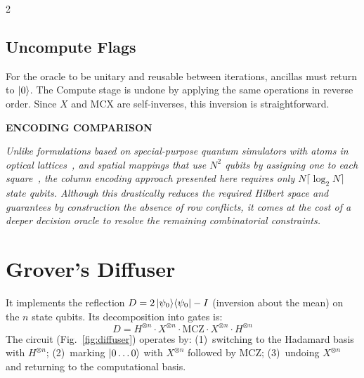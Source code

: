 \documentclass[9pt, a4paper]{extarticle}
\begin{document}
\begin{multicols}{2}
\subsection{Uncompute Flags}

For the oracle to be unitary and reusable between iterations, ancillas must return
to $\ket{0}$. The Compute stage is undone by applying the same operations in reverse
order. Since $X$ and MCX are self-inverses, this inversion is straightforward.

\vspace{0.3cm}
\noindent
\colorbox{boxbg}{%
\begin{minipage}{\dimexpr\columnwidth-2\fboxsep\relax}
\vspace{2pt}
{\small\sffamily\bfseries\color{accent} ENCODING COMPARISON}\par\vspace{1pt}
{\small\itshape
Unlike formulations based on special-purpose quantum simulators
with atoms in optical lattices~\cite{torggler2019}, and spatial mappings that use $N^2$
qubits by assigning one to each square~\cite{jha2018, santhosh2023},
the column encoding approach presented here requires only
$N \lceil\log_2 N\rceil$ state qubits. Although this drastically reduces
the required Hilbert space and guarantees by construction the absence
of row conflicts, it comes at the cost of a deeper decision oracle
to resolve the remaining combinatorial constraints.
}
\vspace{2pt}
\end{minipage}}
\vspace{0.3cm}

\section{Grover's Diffuser}

It implements the reflection $D = 2\ket{\psi_0}\!\bra{\psi_0} - I$ (inversion about
the mean) on the $n$ state qubits. Its decomposition into gates is:
\begin{equation}
    D = H^{\otimes n}\!\cdot\!X^{\otimes n}\!\cdot\!\text{MCZ}
        \!\cdot\!X^{\otimes n}\!\cdot\!H^{\otimes n}
\end{equation}
The circuit (Fig.~\ref{fig:diffuser}) operates by: (1)~switching to the Hadamard
basis with $H^{\otimes n}$; (2)~marking $\ket{0\ldots 0}$ with $X^{\otimes n}$
followed by MCZ; (3)~undoing $X^{\otimes n}$ and returning to the computational basis.


\end{multicols}
\end{document}
